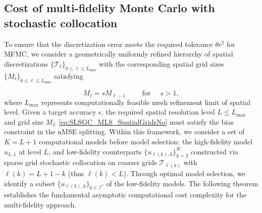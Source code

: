 


\subsection{Cost of multi-fidelity Monte Carlo with stochastic collocation}
\label{sec:Cost_MFMC_with_SC}
To ensure that the discretization error meets the required tolerance $\theta \epsilon^2$ for MFMC, we consider a geometrically uniformly refined hierarchy of spatial discretizations $\{\mathcal{T}_\ell\}_{0\le \ell \le L_{\max}}$ with the corresponding spatial grid sizes $\{M_\ell\}_{0\le \ell \le L_{\max}}$ satisfying 

%
\begin{equation}
\label{eq:MeshGrowth}
M_\ell = s M_{\ell-1} \qquad \text{ for }\quad  s>1,
\end{equation}
%
where $L_{\max}$  represents computationally feasible mesh refinement limit of spatial level. Given a target accuracy $\epsilon$, the required spatial resolution level $L \leq L_{\max}$ and grid size $M_L$ \eqref{eq:SLSGC_MLS_SpatialGridsNo} must satisfy the bias constraint in the nMSE splitting. Within this framework, we consider a set of $K = L+1$ computational models before model selection: the high-fidelity model $u_{L,1}$ at level $L$, and low-fidelity counterparts $\{u_{\ell(k),k}\}_{k=2}^K$ constructed via sparse grid stochastic collocation on coarser grids $\mathcal{T}_{\ell(k)}$ with $\ell(k) = L + 1 - k$ (thus $\ell(k) < L$). Through optimal model selection, we identify a subset $\{u_{\ell(k),k}\}_{k \in \mathcal{I}^*}$ of the low-fidelity models. The following theorem establishes the fundamental asymptotic computational cost complexity for the multi-fidelity approach.


